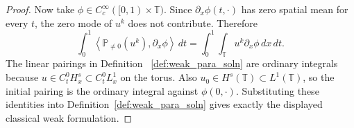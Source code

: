 \documentclass[12pt,reqno,letterpaper]{amsart}
\numberwithin{equation}{section}
\newcommand{\1}{{\bf 1}}
\newcommand{\2}{{\bf 2}}
\newcommand{\T}{\mathbb T}
\theoremstyle{remark}
\theoremstyle{remark}
\begin{document}
\begin{proof}
    Now take $\phi \in C_c^\infty([0,1)\times \T)$. Since $\partial_x \phi(t,\cdot)$ has zero spatial mean for every $t$, the zero mode of $u^k$ does not contribute. Therefore
    \[
    \int_0^1\left\langle \mathbb P_{\neq0}(u^k), \partial_x \phi \right \rangle\,dt = \int_0^1\int_\T u^k \partial_x \phi\,dx\,dt.
    \]
    The linear pairings in Definition ~\ref{def:weak_para_soln} are ordinary integrals because $u\in C_t^0H^s_x \subset C^0_tL^1_x$ on the torus. Also $u_0\in H^s(\T)\subset L^1(\T)$, so the initial pairing is the ordinary integral against $\phi(0,\cdot)$. Substituting these identities into Definition~\ref{def:weak_para_soln} gives exactly the displayed classical weak formulation.
\end{proof}







\end{document}
